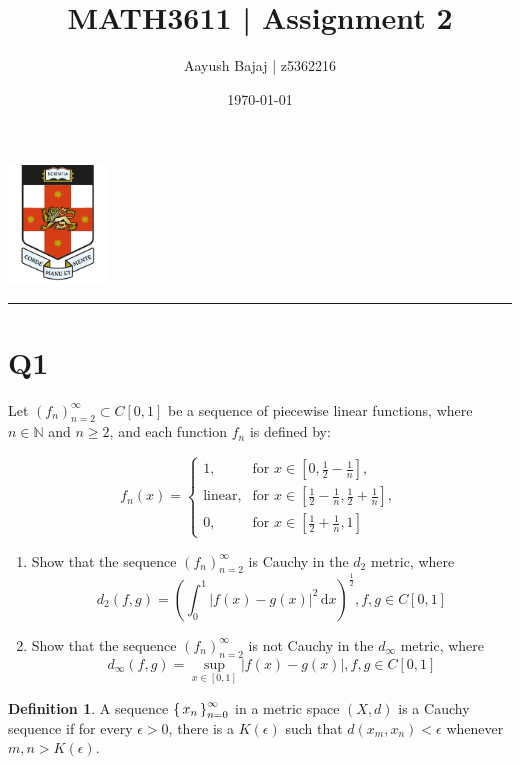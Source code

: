 \documentclass[dvipsnames,12pt]{exam}
\author{Aayush Bajaj | z5362216}
\date{\today}
\title{MATH3611 | Assignment 2}
\theoremstyle{definition}
\newtheorem{definition}{Definition}[section]
\begin{document}
\maketitle
\dotfill
\tableofcontents
\vspace{1cm}
\begin{center}
\includegraphics[width=0.2\textwidth]{logo.png}
\end{center}
\vspace{1cm}
\hrule

\newpage

\section{Q1} \label{question1}
Let $(f_n)^\infty_{n=2} \subset C[0,1]$ be a sequence of piecewise linear functions, where $n\in\mathbb{N}$ and $n\geq 2$, and each function $f_n$ is defined by:

$$
    f_n(x) = \begin{cases}
        1, & \text{for } x\in[0,\frac{1}{2}- \frac{1}{n}],\\
        \text{linear}, & \text{for } x\in[\frac{1}{2}-\frac{1}{n}, \frac{1}{2}+\frac{1}{n}],\\
        0, & \text{for } x\in[\frac{1}{2}+ \frac{1}{n}, 1]
    \end{cases}
$$

\begin{enumerate}[label=(\alph*)]
    \item Show that the sequence $(f_n)^\infty_{n=2}$ is Cauchy in the $d_2$ metric, where $$d_2(f,g) = \left ( \int_0^1 | f(x) - g(x) |^2 \,\mathrm{d} x \right )^\frac{1}{2} , f, g \in C[0,1]$$
    \item Show that the sequence $(f_n)^\infty_{n=2}$ is not Cauchy in the $d_\infty$ metric, where $$d_\infty(f,g) = \sup_{x\in[0,1]}|f(x)-g(x)|, f, g \in C[0,1]$$
\end{enumerate}

\begin{definition}\label{definition}
    A sequence $\set{x_n}^\infty_{n=0}$ in a metric space $(X, d)$ is a Cauchy sequence if for every $\epsilon > 0$, there is a $K(\epsilon)$ such that $d(x_m, x_n) < \epsilon$ whenever $m, n > K(\epsilon)$.
\end{definition}
\end{document}
